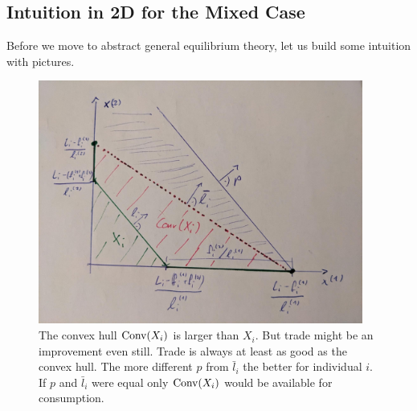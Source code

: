 \subsection{Intuition in 2D for the Mixed Case}

\FloatBarrier
Before we move to abstract general equilibrium theory, let us build some
intuition with pictures.

\begin{figure}
	\includegraphics[width=0.95\textwidth]{images/conv_hull_vs_trade.jpeg}
	\centering
	\caption{
		The convex hull \(\operatorname{Conv}(X_i)\) is larger than \(X_i\). But trade might
		be an improvement even still. Trade is always at least as good as the
		convex hull. The more different \(p\) from \(\bar{l}_i\) the better for
		individual \(i\). If \(p\) and \(\bar{l}_i\) were equal only
		\(\operatorname{Conv}(X_i)\) would be available for consumption.
	}
\end{figure}

